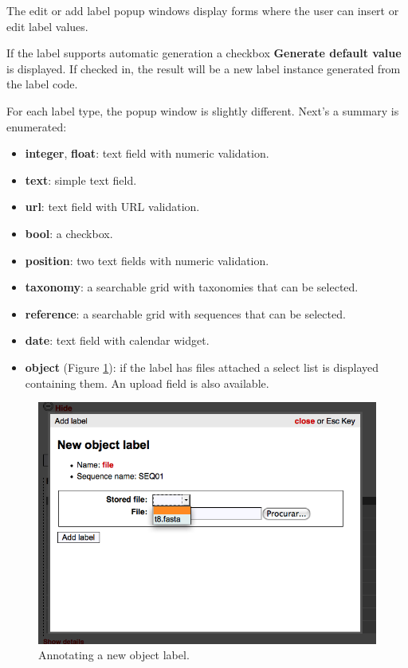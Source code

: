 The edit or add label popup windows display forms where the user can insert or edit label values.

If the label supports automatic generation a checkbox \textbf{Generate default value} is displayed.
If checked in, the result will be a new label instance generated from the label code.

For each label type, the popup window is slightly different. Next's a summary is enumerated:

\begin{itemize}
  \item \textbf{integer}, \textbf{float}: text field with numeric validation.
  \item \textbf{text}: simple text field.
  \item \textbf{url}: text field with URL validation.
  \item \textbf{bool}: a checkbox.
  \item \textbf{position}: two text fields with numeric validation.
  \item \textbf{taxonomy}: a searchable grid with taxonomies that can be selected.
  \item \textbf{reference}: a searchable grid with sequences that can be selected.
  \item \textbf{date}: text field with calendar widget.
  \item \textbf{object} (Figure \ref{fig:obj_label2}): if the label has files attached a select list is displayed containing them.
  An upload field is also available.
\end{itemize}

\begin{figure}[ht]
  \centering
    \includegraphics[scale=0.5]{obj_label.png}
  \caption{Annotating a new object label.}
  \label{fig:obj_label2}
\end{figure}

